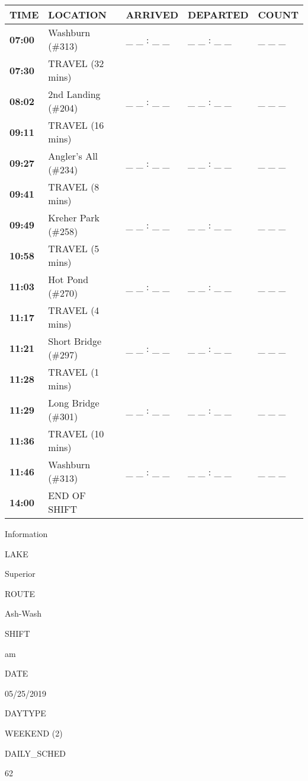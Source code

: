 \documentclass[]{article}
\begin{document}
\begin{tabular}{>{\bfseries}lllll}
\toprule
\textbf{TIME} & \textbf{LOCATION} & \textbf{ARRIVED} & \textbf{DEPARTED} & \textbf{COUNT}\\
\midrule
07:00 & Washburn (\#313) & \_ \_ : \_ \_ & \_ \_ : \_ \_ & \_ \_ \_\\
07:30 & TRAVEL (32 mins) &  &  & \\
08:02 & 2nd Landing (\#204) & \_ \_ : \_ \_ & \_ \_ : \_ \_ & \_ \_ \_\\
09:11 & TRAVEL (16 mins) &  &  & \\
09:27 & Angler's All (\#234) & \_ \_ : \_ \_ & \_ \_ : \_ \_ & \_ \_ \_\\
09:41 & TRAVEL (8 mins) &  &  & \\
09:49 & Kreher Park (\#258) & \_ \_ : \_ \_ & \_ \_ : \_ \_ & \_ \_ \_\\
10:58 & TRAVEL (5 mins) &  &  & \\
11:03 & Hot Pond (\#270) & \_ \_ : \_ \_ & \_ \_ : \_ \_ & \_ \_ \_\\
11:17 & TRAVEL (4 mins) &  &  & \\
11:21 & Short Bridge (\#297) & \_ \_ : \_ \_ & \_ \_ : \_ \_ & \_ \_ \_\\
11:28 & TRAVEL (1 mins) &  &  & \\
11:29 & Long Bridge (\#301) & \_ \_ : \_ \_ & \_ \_ : \_ \_ & \_ \_ \_\\
11:36 & TRAVEL (10 mins) &  &  & \\
11:46 & Washburn (\#313) & \_ \_ : \_ \_ & \_ \_ : \_ \_ & \_ \_ \_\\
14:00 & END OF SHIFT &  &  & \\
\bottomrule
\end{tabular}\newpage

Information

LAKE

Superior

ROUTE

Ash-Wash

SHIFT

am

DATE

05/25/2019

DAYTYPE

WEEKEND (2)

DAILY\_SCHED

62

\vspace{24pt}
\end{document}
